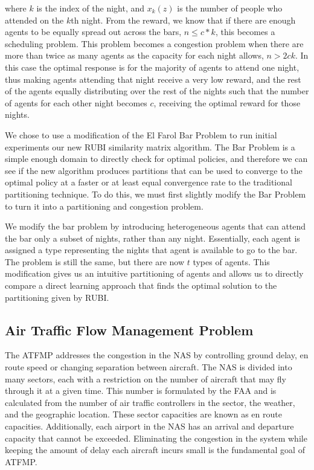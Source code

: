 \documentclass[onehalf,11pt]{beavtex}
\begin{document}
where $k$ is the index of the night, and $x_k(z)$ is the number of people who attended on the $k$th night. From the reward, we know that if there are enough agents to be equally spread out across the bars, $n \leq c * k$, this becomes a scheduling problem. This problem becomes a congestion problem when there are more than twice as many agents as the capacity for each night allows, $n > 2ck$. In this case the optimal response is for the majority of agents to attend one night, thus making agents attending that night receive a very low reward, and the rest of the agents equally distributing over the rest of the nights such that the number of agents for each other night becomes $c$, receiving the optimal reward for those nights. 

We chose to use a modification of the El Farol Bar Problem to run initial experiments our new RUBI similarity matrix algorithm. The Bar Problem is a simple enough domain to directly check for optimal policies, and therefore we can see if the new algorithm produces partitions that can be used to converge to the optimal policy at a faster or at least equal convergence rate to the traditional partitioning technique. To do this, we must first slightly modify the Bar Problem to turn it into a partitioning and congestion problem. 

We modify the bar problem by introducing heterogeneous agents that can attend the bar only a subset of nights, rather than any night. Essentially, each agent is assigned a type representing the nights that agent is available to go to the bar. The problem is still the same, but there are now $t$ types of agents. This modification gives us an intuitive partitioning of agents and allows us to directly compare a direct learning approach that finds the optimal solution to the partitioning given by RUBI.


\subsection{Air Traffic Flow Management Problem}

The ATFMP addresses the congestion in the NAS by controlling ground delay, en route speed or changing separation between aircraft. The NAS is divided into many sectors, each with a restriction on the number of aircraft that may fly through it at a given time. This number is formulated by the FAA and is calculated from the number of air traffic controllers in the sector, the weather, and the geographic location. These sector capacities are known as en route capacities. Additionally, each airport in the NAS has an arrival and departure capacity that cannot be exceeded. Eliminating the congestion in the system while keeping the amount of delay each aircraft incurs small is the fundamental goal of ATFMP. 
\end{document}

